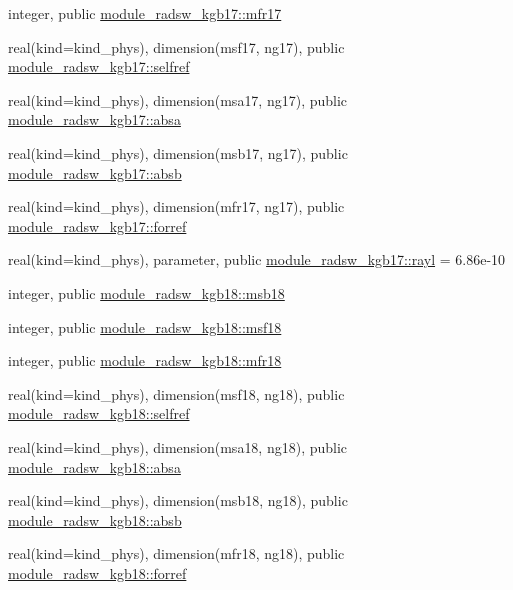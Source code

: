 \begin{DoxyCompactItemize}
\item 
integer, public \hyperlink{group__module__radsw__main_gadd099d7e1b5e7767d77de6d96673e26f}{module\+\_\+radsw\+\_\+kgb17\+::mfr17}
\item 
real(kind=kind\+\_\+phys), dimension(msf17, ng17), public \hyperlink{group__module__radsw__main_gaade34dfbe8c5f380088b6e03acc727c9}{module\+\_\+radsw\+\_\+kgb17\+::selfref}
\item 
real(kind=kind\+\_\+phys), dimension(msa17, ng17), public \hyperlink{group__module__radsw__main_ga19083764c3dfe437282b032517baf3ed}{module\+\_\+radsw\+\_\+kgb17\+::absa}
\item 
real(kind=kind\+\_\+phys), dimension(msb17, ng17), public \hyperlink{group__module__radsw__main_gaef407d13a88f5e1bfd20652ab3010e2f}{module\+\_\+radsw\+\_\+kgb17\+::absb}
\item 
real(kind=kind\+\_\+phys), dimension(mfr17, ng17), public \hyperlink{group__module__radsw__main_ga5041a137ba35dca9a767ce854748dd49}{module\+\_\+radsw\+\_\+kgb17\+::forref}
\item 
real(kind=kind\+\_\+phys), parameter, public \hyperlink{group__module__radsw__main_gaa4862628a06e0e08d1db5637bc62ffa5}{module\+\_\+radsw\+\_\+kgb17\+::rayl} = 6.\+86e-\/10
\item 
integer, public \hyperlink{group__module__radsw__main_gad2e52d9beb90328236a351926d1a3432}{module\+\_\+radsw\+\_\+kgb18\+::msb18}
\item 
integer, public \hyperlink{group__module__radsw__main_ga1d74002f71710887e45df89d3897a10a}{module\+\_\+radsw\+\_\+kgb18\+::msf18}
\item 
integer, public \hyperlink{group__module__radsw__main_ga9fa8140413e7ec769baea4f207e58393}{module\+\_\+radsw\+\_\+kgb18\+::mfr18}
\item 
real(kind=kind\+\_\+phys), dimension(msf18, ng18), public \hyperlink{group__module__radsw__main_ga488f807878d909b8f69457b0d7d8ac6a}{module\+\_\+radsw\+\_\+kgb18\+::selfref}
\item 
real(kind=kind\+\_\+phys), dimension(msa18, ng18), public \hyperlink{group__module__radsw__main_ga8a7787776bd057b1815e92a5f58b9cac}{module\+\_\+radsw\+\_\+kgb18\+::absa}
\item 
real(kind=kind\+\_\+phys), dimension(msb18, ng18), public \hyperlink{group__module__radsw__main_ga858680db0ee5e9a599639844a91f8f06}{module\+\_\+radsw\+\_\+kgb18\+::absb}
\item 
real(kind=kind\+\_\+phys), dimension(mfr18, ng18), public \hyperlink{group__module__radsw__main_ga0efc293c91de3d17b29ed713ff09d7a9}{module\+\_\+radsw\+\_\+kgb18\+::forref}

\end{DoxyCompactItemize}
